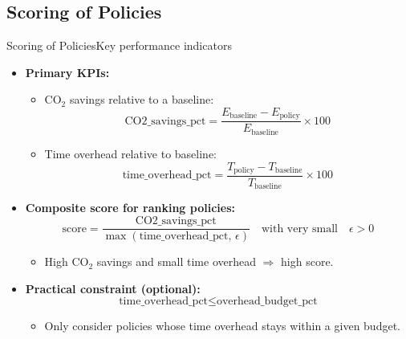 \subsection{Scoring of Policies}

\begin{frame}[t]{Scoring of Policies}{Key performance indicators}

  \begin{itemize}
    \item \textbf{Primary KPIs:}
      \begin{itemize}
        \item CO$_2$ savings relative to a baseline:
          \[
            \text{CO2\_savings\_pct}
            = \frac{E_{\text{baseline}} -
            E_{\text{policy}}}{E_{\text{baseline}}} \times 100
          \]
        \item Time overhead relative to baseline:
          \[
            \text{time\_overhead\_pct}
            = \frac{T_{\text{policy}} -
            T_{\text{baseline}}}{T_{\text{baseline}}} \times 100
          \]
      \end{itemize}

      \vspace{0.2cm}
    \item \textbf{Composite score for ranking policies:}
      \[
        \text{score} =
        \frac{\text{CO2\_savings\_pct}}
        {\max(\text{time\_overhead\_pct}, \,\epsilon)}
        \quad\text{with very small}\quad \epsilon > 0
      \]
      \begin{itemize}
        \item High CO$_2$ savings and small time overhead
          $\Rightarrow$ high score.
      \end{itemize}

      \vspace{0.2cm}
    \item \textbf{Practical constraint (optional):}
      \[
        \text{time\_overhead\_pct} \leq \text{overhead\_budget\_pct}
      \]
      \begin{itemize}
        \item Only consider policies whose time overhead stays within
          a given budget.
      \end{itemize}
  \end{itemize}

\end{frame}
